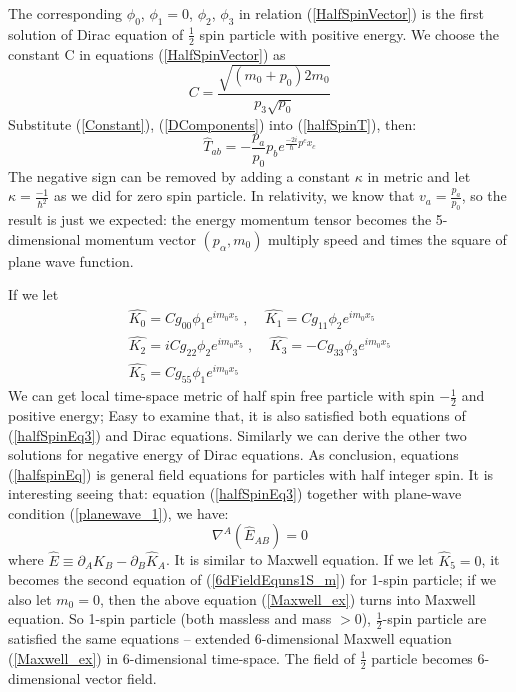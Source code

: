 \documentclass[twocolumn,showpacs,preprintnumbers,amsmath,amssymb]{revtex4}
\begin{document}
The corresponding $\phi_0$, $\phi_1 = 0$,
$\phi_2$, $\phi_3$ in relation (\ref{HalfSpinVector}) is the first solution of Dirac equation of $\frac{1}{2}$ spin particle with positive energy. 
We choose the constant C in equations (\ref{HalfSpinVector}) as
\begin{equation}
C = \frac{\sqrt{(m_0+p_0)2m_0}}{p_3 \sqrt{p_0}}
\label{Constant}
\end{equation}
Substitute (\ref{Constant}), (\ref{DComponents}) into (\ref{halfSpinT}), then:
\begin{equation}
\hat{T}_{ab} = -\frac{p_{a}}{p_0}p_{b}e^{\frac{-2i}{\hbar}p^{c}x_{c}} 
\label{TAB}
\end{equation}
The negative sign can be removed by adding a constant $\kappa$ in metric and let $\kappa = \frac{-1}{\hbar^2} $ as we did for
zero spin particle. In relativity, we know that $v_a = \frac{p_{a}}{p_0} $, so  
the result is just we expected: the energy momentum tensor becomes
the 5-dimensional momentum vector $(p_{\alpha},m_0)$ multiply speed and times the square of plane wave function.

If we let 
\begin{eqnarray}
\hat{K_0} = Cg_{00}\phi_1 e^{ im_0 x_5}  \;, \; \; \; \;
\hat{K_1} = Cg_{11}\phi_2 e^{ im_0 x_5}  \nonumber \\
\hat{K_2} = iCg_{22}\phi_2 e^{im_0 x_5}  \;, \; \; \; \;
\hat{K_3} = -Cg_{33}\phi_3 e^{im_0 x_5}  \nonumber \\
\hat{K_5} = Cg_{55}\phi_1 e^{im_0 x_5}  
\label{HalfSpinVector_2} 
\end{eqnarray}
We can get local time-space metric of half spin free particle with spin $-\frac{1}{2}$ and positive energy;
Easy to examine that, it is also satisfied both equations of (\ref{halfSpinEq3}) and Dirac equations.
Similarly we can derive the other two solutions for negative energy of Dirac equations.  As conclusion, equations
(\ref{halfspinEq}) is general field equations for particles with half integer spin. It is interesting seeing that:
equation (\ref{halfSpinEq3}) together with plane-wave condition (\ref{planewave_1}), we have:
\begin{equation}
\nabla^{A}(\hat{E}_{AB}) = 0   
\label{Maxwell_ex}
\end{equation}
where $ \hat{E} \equiv \partial_{A} \hat{K}_{B} - 
\partial_{B} \hat{K}_{A} $. It is similar to Maxwell equation. If we let $\hat{K}_5 = 0$, it becomes
the second equation of (\ref{6dFieldEquns1S_m}) for 1-spin particle; if we also let $m_0 = 0$, then the above equation
(\ref{Maxwell_ex}) turns into Maxwell equation. So 1-spin particle (both massless and mass $>0$), $\frac{1}{2}$-spin particle
are satisfied the same equations -- extended 6-dimensional Maxwell equation (\ref{Maxwell_ex}) in 6-dimensional time-space.
The field of $\frac{1}{2}$ particle becomes 6-dimensional vector field.
\end{document}
